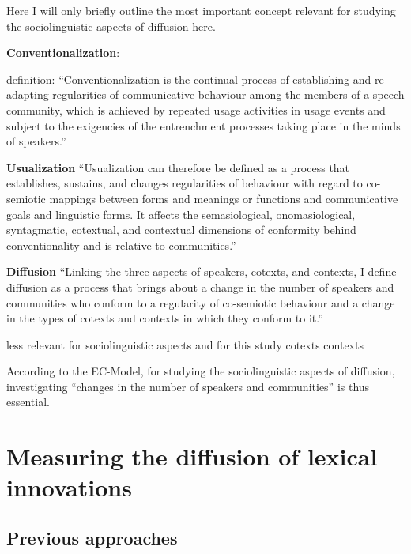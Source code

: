 \documentclass[
  a4paper,
  abstract=on,
  captions=tableabove
  ]{scrartcl}
\renewcommand{\hw}[1]{\textbf{#1}}
\begin{document}
  Here I will only briefly outline the most important concept relevant for studying the sociolinguistic aspects of diffusion here.

  \hw{Conventionalization}:

  definition: \enquote{Conventionalization is the continual process of establishing and re-adapting regularities of communicative behaviour among the members of a speech community, which is achieved by repeated usage activities in usage events and subject to the exigencies of the entrenchment processes taking place in the minds of speakers.}~\parencite{Schmid2020DynamicsLinguistic}

  \hw{Usualization} \enquote{Usualization can therefore be defined as a process that establishes, sustains, and changes regularities of behaviour with regard to co-semiotic mappings between forms and meanings or functions and communicative goals and linguistic forms. It affects the semasiological, onomasiological, syntagmatic, cotextual, and contextual dimensions of conformity behind conventionality and is relative to communities.}~\parencite{Schmid2020DynamicsLinguistic}

  \hw{Diffusion} \enquote{Linking the three aspects of speakers, cotexts, and contexts, I define diffusion as a process that brings about a change in the number of speakers and communities who conform to a regularity of co-semiotic behaviour and a change in the types of cotexts and contexts in which they conform to it.}~\parencite{Schmid2020DynamicsLinguistic}

  less relevant for sociolinguistic aspects and for this study
  cotexts
  contexts

  According to the EC-Model, for studying the sociolinguistic aspects of diffusion, investigating \enquote{changes in the number of speakers and communities} is thus essential.

\section{Measuring the diffusion of lexical innovations}
  \label{sec:measuring-diff}
  \subsection{Previous approaches}
    \label{subsec:previous-approaches}
\end{document}
